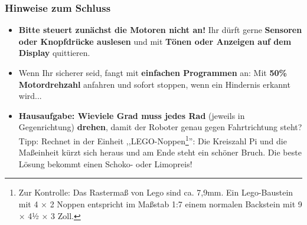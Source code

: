 \documentclass{beamer}
\begin{document}
\begin{frame}
\frametitle{Hinweise zum Schluss}
\begin{itemize}
\item
\textbf{Bitte steuert zunächst die Motoren nicht an!} Ihr dürft gerne \textbf{Sensoren oder Knopfdrücke auslesen} und mit \textbf{Tönen oder Anzeigen auf dem Display}  quittieren.
\item Wenn Ihr sicherer seid, fangt mit \textbf{einfachen Programmen} an: Mit \textbf{50\% Motordrehzahl} anfahren und sofort stoppen, wenn ein Hindernis erkannt wird...
\item \textbf{Hausaufgabe: Wieviele Grad muss jedes Rad} (jeweils in Gegenrichtung) \textbf{drehen}, damit der Roboter genau gegen Fahrtrichtung steht? Tipp: Rechnet in der Einheit ,,LEGO-Noppen\footnote{Zur Kontrolle: Das Rastermaß von Lego sind ca. 7,9mm. Ein Lego-Baustein mit 4 × 2 Noppen entspricht im Maßstab 1:7 einem normalen Backstein mit 9 × 4½ × 3 Zoll.}'': Die Kreiszahl Pi und die Maßeinheit kürzt sich heraus und am Ende steht ein schöner Bruch. Die beste Lösung bekommt einen Schoko- oder Limopreis!
\end{itemize}
\end{frame}

\end{document}
